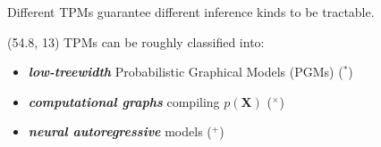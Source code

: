\documentclass[final]{beamer}
\begin{document}
\begin{frame}{}
\begin{textblock}{25.2}
    Different TPMs guarantee different inference kinds to be tractable.
  \end{textblock}
  
  \begin{textblock}{25.2}(54.8, 13)
    \small
    TPMs can be roughly classified into:
    \begin{itemize}
    \item \textbf{\emph{low-treewidth}} Probabilistic Graphical Models
      (PGMs) ($^*$)
    \item \textbf{\emph{computational graphs}} compiling
      $p(\mathbf{X})$ ($^\times$)
    \item \textbf{\emph{neural autoregressive}} models ($^+$) 
    \end{itemize}
     
  \end{textblock}


\end{frame}
\end{document}
